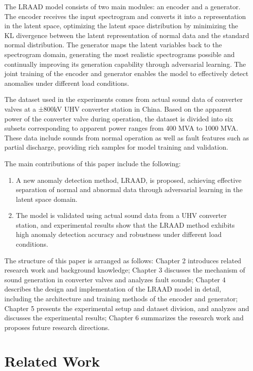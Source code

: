 \documentclass{article}
\begin{document}
The LRAAD model consists of two main modules: an encoder and a generator. The encoder receives the input spectrogram and converts it into a representation in the latent space, optimizing the latent space distribution by minimizing the KL divergence between the latent representation of normal data and the standard normal distribution. The generator maps the latent variables back to the spectrogram domain, generating the most realistic spectrograms possible and continually improving its generation capability through adversarial learning. The joint training of the encoder and generator enables the model to effectively detect anomalies under different load conditions.

The dataset used in the experiments comes from actual sound data of converter valves at a ±800kV UHV converter station in China. Based on the apparent power of the converter valve during operation, the dataset is divided into six subsets corresponding to apparent power ranges from 400 MVA to 1000 MVA. These data include sounds from normal operation as well as fault features such as partial discharge, providing rich samples for model training and validation.

The main contributions of this paper include the following: 
\begin{enumerate} 
\item A new anomaly detection method, LRAAD, is proposed, achieving effective separation of normal and abnormal data through adversarial learning in the latent space domain. 
\item The model is validated using actual sound data from a UHV converter station, and experimental results show that the LRAAD method exhibits high anomaly detection accuracy and robustness under different load conditions. 
\end{enumerate}

The structure of this paper is arranged as follows: Chapter 2 introduces related research work and background knowledge; Chapter 3 discusses the mechanism of sound generation in converter valves and analyzes fault sounds; Chapter 4 describes the design and implementation of the LRAAD model in detail, including the architecture and training methods of the encoder and generator; Chapter 5 presents the experimental setup and dataset division, and analyzes and discusses the experimental results; Chapter 6 summarizes the research work and proposes future research directions.

\section{Related Work}
\end{document}
